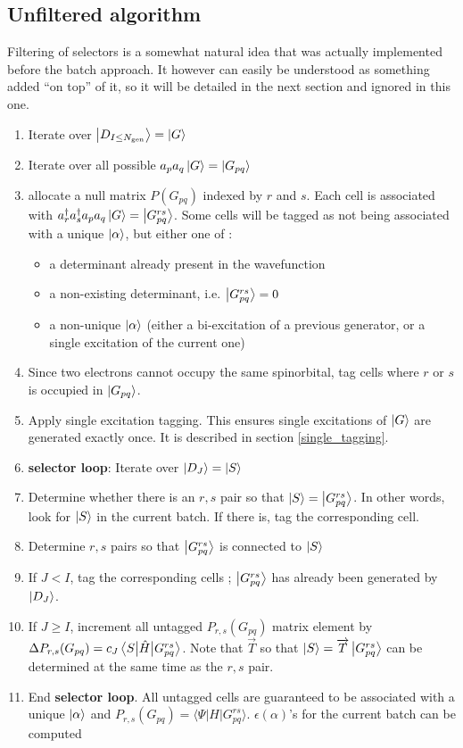 \documentclass[./thesis.tex]{subfiles}
\newcommand{\Gpqrs}{\ket{G^{rs}_{pq}}}
\begin{document}
\subsection{Unfiltered algorithm}

Filtering of selectors is a somewhat natural idea that was actually implemented before the batch approach. It however can easily be understood as something added ``on top'' of it, so it will be detailed in the next section and ignored in this one.



\begin{enumerate}
\item
Iterate over $\ket {D_{I \leq {N_\text{gen}}}} = \ket G$
\item
Iterate over all possible $a_p a_q \ket G = \ket {G_{pq}}$
\item
allocate a null matrix $P(G_{pq})$ indexed by $r$ and $s$. Each cell is associated with $a^\dagger_r a^\dagger_s a_p a_q  \ket G = \Gpqrs$. Some cells will be tagged as not being associated with a unique $\ket \alpha$, but either one of :
\begin{itemize}
\item
a determinant already present in the wavefunction
\item
a non-existing determinant, i.e. $\Gpqrs = 0$
\item
a non-unique $\ket \alpha$ (either a bi-excitation of a previous generator, or a single excitation of the current one)
\end{itemize}

\item
Since two electrons cannot occupy the same spinorbital, tag cells where $r$ or $s$ is occupied in $\ket {G_{pq}}$.
\item
Apply single excitation tagging. This ensures single excitations of $\ket G$ are generated exactly once. It is described in section \ref{single_tagging}.
\item
\textbf{selector loop}: Iterate over $\ket {D_J} = \ket S$ 
\item
Determine whether there is an $r,s$ pair so that $\ket S = \ket {G_{pq}^{rs}}$. In other words, look for $\ket S$ in the current batch. If there is, tag the corresponding cell.
\item
Determine $r,s$ pairs so that $\ket {G_{pq}^{rs}}$ is connected to $\ket S$
\item
If $J<I$, tag the corresponding cells ; $\ket {G_{pq}^{rs}}$ has already been generated by $\ket {D_J}$.
\item
If $J \geq I$, increment all untagged $P_{r,s}(G_{pq})$ matrix element by $\Delta P_{r,s}(G_{pq}) = c_J \mel{S}{\hat{H}}{G^{rs}_{pq}}$. Note that $\overrightarrow{T}$ so that $\ket S=\overrightarrow{T} \Gpqrs$ can be determined at the same time as the $r,s$ pair.
\item
End \textbf{selector loop}. All untagged cells are guaranteed to be associated with a unique $\ket \alpha$ and $P_{r,s}(G_{pq}) = \langle \Psi |H|G^{rs}_{pq} \rangle$. $\epsilon(\alpha)$'s for the current batch can be computed  \\


\end{enumerate}
\end{document}
